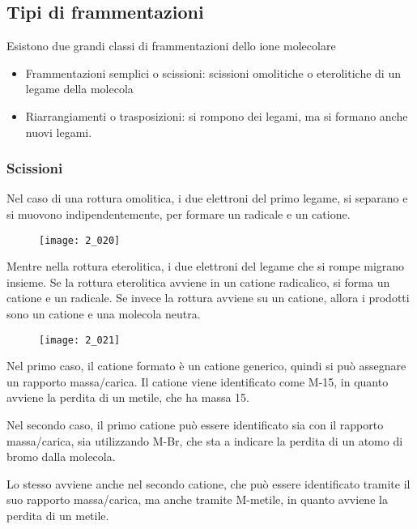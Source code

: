 \subsection{Tipi di frammentazioni}

Esistono due grandi classi di frammentazioni dello ione molecolare

\begin{itemize}
\item
  Frammentazioni semplici o scissioni: scissioni omolitiche o
  eterolitiche di un legame della molecola
\item
  Riarrangiamenti o trasposizioni: si rompono dei legami, ma si formano
  anche nuovi legami.
\end{itemize}

\subsubsection{Scissioni}

Nel caso di una rottura omolitica, i due elettroni del primo legame, si
separano e si muovono indipendentemente, per formare un radicale e un
catione.

\begin{figure}[H]
  \texttt{[image: 2\_020]}
\end{figure}

Mentre nella rottura eterolitica, i due elettroni del legame che si
rompe migrano insieme. Se la rottura eterolitica avviene in un catione
radicalico, si forma un catione e un radicale. Se invece la rottura
avviene su un catione, allora i prodotti sono un catione e una molecola
neutra.

\begin{figure}[H]
  \texttt{[image: 2\_021]}
\end{figure}

Nel primo caso, il catione formato è un catione generico, quindi si può
assegnare un rapporto massa/carica. Il catione viene identificato come
M-15, in quanto avviene la perdita di un metile, che ha massa 15.

Nel secondo caso, il primo catione può essere identificato sia con il
rapporto massa/carica, sia utilizzando M-Br, che sta a indicare la
perdita di un atomo di bromo dalla molecola.

Lo stesso avviene anche nel secondo catione, che può essere identificato
tramite il suo rapporto massa/carica, ma anche tramite M-metile, in
quanto avviene la perdita di un metile.

